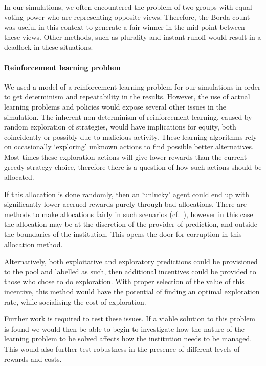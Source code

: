 In our simulations, we often encountered the problem of two groups with equal
voting power who are representing opposite views. Therefore, the Borda count was
useful in this context to generate a fair winner in the mid-point between
these views. Other methods, such as plurality and instant runoff would result
in a deadlock in these situations.

\paragraph{Reinforcement learning problem} We used a model of a 
reinforcement-learning problem for our simulations in order to get determinism and
repeatability in the results. However, the use of actual learning problems and
policies would expose several other issues in the simulation. The inherent
non-determinism of reinforcement learning, caused by random exploration of strategies,
would have implications for equity,
both coincidently or possibly due to malicious activity. These learning
algorithms rely on occasionally `exploring' unknown actions to find possible
better alternatives. Most times these exploration actions will give lower
rewards than the current greedy strategy choice, therefore there is a question
of how such actions should be allocated.

If this allocation is done randomly, then an `unlucky' agent could end up with
significantly lower accrued rewards purely through bad allocations. There are methods
to make allocations fairly in such scenarios (cf.~\citet{Pitt2014}), however
in this case the allocation may be at the discretion of the provider of prediction,
and outside the boundaries of the institution. This opens the door for
corruption in this allocation method.

Alternatively, both exploitative and exploratory predictions could be
provisioned to the pool and labelled as such, then additional incentives could
be provided to those who chose to do exploration. With proper selection of the
value of this incentive, this method would have the potential of finding an
optimal exploration rate, while socialising the cost of exploration.

Further work is required to test these issues.
If a viable solution to this problem is found we would then be able
to begin to investigate how the nature of the learning problem to be solved
affects how the institution needs to be managed. This would also further test
robustness in the presence of different levels of rewards and costs.

